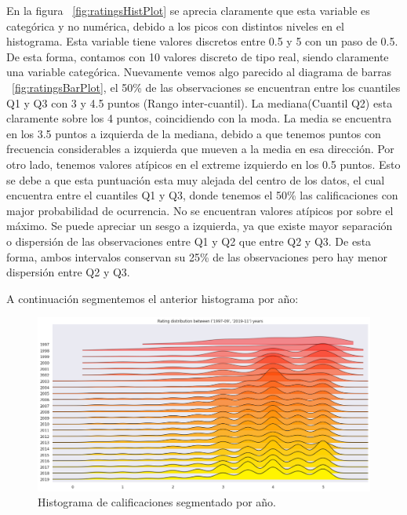\documentclass[11pt,a4paper,twoside]{thesis}
\begin{document}
En la figura ~\ref{fig:ratingsHistPlot} se aprecia claramente que esta variable es categórica y no numérica, debido a los picos con distintos niveles en el histograma. Esta variable tiene valores discretos entre 0.5 y 5 con un paso de 0.5. De esta forma, contamos con 10 valores discreto de tipo real, siendo claramente una variable categórica. Nuevamente vemos algo parecido al diagrama de barras ~\ref{fig:ratingsBarPlot}, el 50\% de las observaciones se encuentran entre los cuantiles Q1 y Q3 con 3 y 4.5 puntos (Rango inter-cuantil). La mediana(Cuantil Q2) esta claramente sobre los 4 puntos, coincidiendo con la moda. La media se encuentra en los 3.5 puntos a izquierda de la mediana, debido a que tenemos puntos con frecuencia considerables a izquierda que mueven a la media en esa dirección.
Por otro lado, tenemos valores atípicos en el extreme izquierdo en los 0.5 puntos. Esto se debe a que esta puntuación esta muy alejada del centro de los datos, el cual encuentra entre el cuantiles Q1 y Q3, donde tenemos el 50\% las calificaciones con major probabilidad de ocurrencia. No se encuentran valores atípicos por sobre el máximo.
Se puede apreciar un sesgo a izquierda, ya que existe mayor separación o dispersión de las observaciones entre Q1 y Q2 que entre Q2 y Q3. De esta forma, ambos intervalos conservan su 25\% de las observaciones pero hay menor dispersión entre Q2 y Q3.


\clearpage
A continuación segmentemos el anterior histograma por año:

\begin{figure}[h!]
	\centering
	\includegraphics[width=15cm]{./images/rating-by-year.png}
	\caption{Histograma de calificaciones segmentado por año.}
	\label{fig:ratingsYearHistPlot}
\end{figure}
\end{document}
